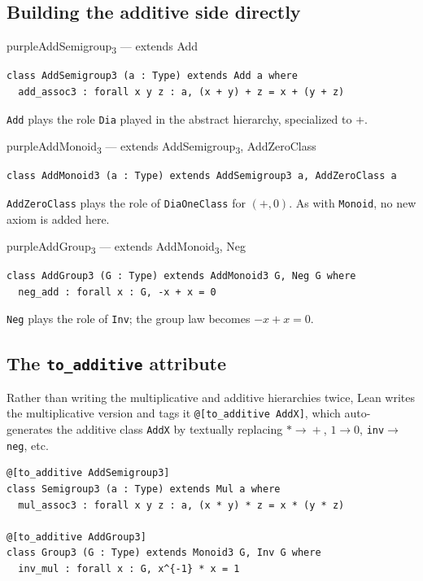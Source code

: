\documentclass[11pt]{article}
\begin{document}
\subsection{Building the additive side directly}

\begin{defbox}{purple}{AddSemigroup\textsubscript{3} --- extends Add}
\begin{lstlisting}
class AddSemigroup3 (a : Type) extends Add a where
  add_assoc3 : forall x y z : a, (x + y) + z = x + (y + z)
\end{lstlisting}
\texttt{Add} plays the role \texttt{Dia} played in the abstract hierarchy, specialized to $+$.
\end{defbox}

\begin{defbox}{purple}{AddMonoid\textsubscript{3} --- extends AddSemigroup\textsubscript{3}, AddZeroClass}
\begin{lstlisting}
class AddMonoid3 (a : Type) extends AddSemigroup3 a, AddZeroClass a
\end{lstlisting}
\texttt{AddZeroClass} plays the role of \texttt{DiaOneClass} for $(+,0)$. As with \texttt{Monoid}, no new axiom is added here.
\end{defbox}

\begin{defbox}{purple}{AddGroup\textsubscript{3} --- extends AddMonoid\textsubscript{3}, Neg}
\begin{lstlisting}
class AddGroup3 (G : Type) extends AddMonoid3 G, Neg G where
  neg_add : forall x : G, -x + x = 0
\end{lstlisting}
\texttt{Neg} plays the role of \texttt{Inv}; the group law becomes $-x + x = 0$.
\end{defbox}

\subsection{The \texttt{to\_additive} attribute}

Rather than writing the multiplicative and additive hierarchies twice, Lean writes the multiplicative version and tags it \verb|@[to_additive AddX]|, which auto-generates the additive class \texttt{AddX} by textually replacing $*\!\to\!+$, $1\!\to\!0$, \texttt{inv}$\to$\texttt{neg}, etc.

\begin{lstlisting}
@[to_additive AddSemigroup3]
class Semigroup3 (a : Type) extends Mul a where
  mul_assoc3 : forall x y z : a, (x * y) * z = x * (y * z)

@[to_additive AddGroup3]
class Group3 (G : Type) extends Monoid3 G, Inv G where
  inv_mul : forall x : G, x^{-1} * x = 1
\end{lstlisting}
\end{document}
